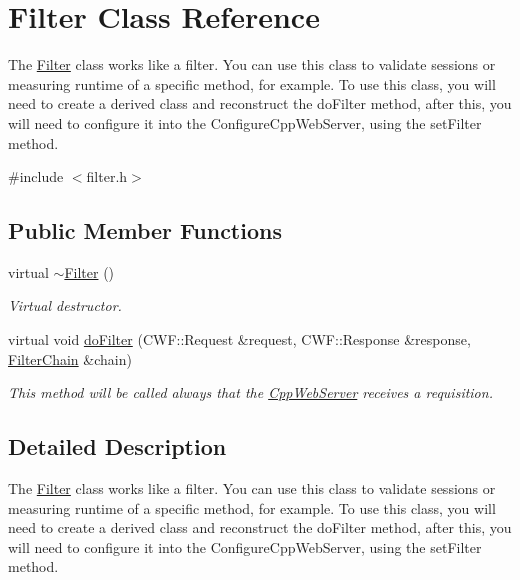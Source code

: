 \hypertarget{class_filter}{}\section{Filter Class Reference}
\label{class_filter}


The \hyperlink{class_filter}{Filter} class works like a filter. You can use this class to validate sessions or measuring runtime of a specific method, for example. To use this class, you will need to create a derived class and reconstruct the do\+Filter method, after this, you will need to configure it into the Configure\+Cpp\+Web\+Server, using the set\+Filter method.  




{\ttfamily \#include $<$filter.\+h$>$}

\subsection*{Public Member Functions}
\begin{DoxyCompactItemize}
\item 
\mbox{\label{class_filter_aa37dc017d133404b3a326f363ce36b8a}} 
virtual \hyperlink{class_filter_aa37dc017d133404b3a326f363ce36b8a}{$\sim$\+Filter} ()
\begin{DoxyCompactList}\small\item\em Virtual destructor. \end{DoxyCompactList}\item 
virtual void \hyperlink{class_filter_a7648d16d5bc8cc5c95c072f34e507f7f}{do\+Filter} (C\+W\+F\+::\+Request \&request, C\+W\+F\+::\+Response \&response, \hyperlink{class_filter_chain}{Filter\+Chain} \&chain)
\begin{DoxyCompactList}\small\item\em This method will be called always that the \hyperlink{class_cpp_web_server}{Cpp\+Web\+Server} receives a requisition. \end{DoxyCompactList}\end{DoxyCompactItemize}


\subsection{Detailed Description}
The \hyperlink{class_filter}{Filter} class works like a filter. You can use this class to validate sessions or measuring runtime of a specific method, for example. To use this class, you will need to create a derived class and reconstruct the do\+Filter method, after this, you will need to configure it into the Configure\+Cpp\+Web\+Server, using the set\+Filter method. 


